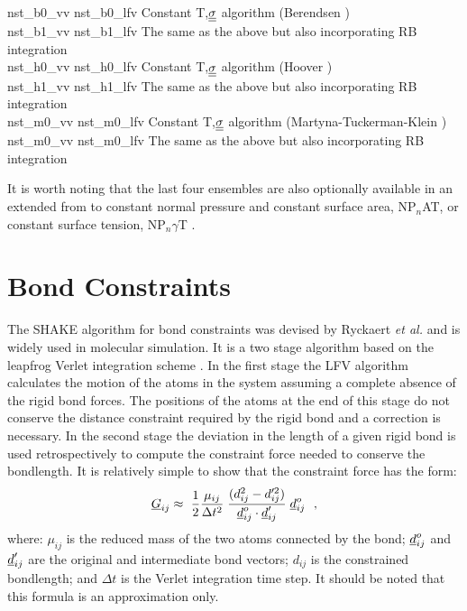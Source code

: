 \begin{tabbing}
{\sc nst\_b0\_vv}     \> {\sc nst\_b0\_lfv} \> Constant T,$\mbox{$\underline{\underline{\bf \sigma}}$}$ algorithm (Berendsen \cite{berendsen-84a}) \\
{\sc nst\_b1\_vv}     \> {\sc nst\_b1\_lfv} \> The same as the above but also incorporating RB integration \\
{\sc nst\_h0\_vv}     \> {\sc nst\_h0\_lfv} \> Constant T,$\mbox{$\underline{\underline{\bf \sigma}}$}$ algorithm (Hoover \cite{hoover-85a}) \\
{\sc nst\_h1\_vv}     \> {\sc nst\_h1\_lfv} \> The same as the above but also incorporating RB integration \\
{\sc nst\_m0\_vv}     \> {\sc nst\_m0\_lfv} \> Constant T,$\mbox{$\underline{\underline{\bf \sigma}}$}$ algorithm (Martyna-Tuckerman-Klein \cite{martyna-96a}) \\
{\sc nst\_m0\_vv}     \> {\sc nst\_m0\_lfv} \> The same as the above but also incorporating RB integration
\end{tabbing}

It is worth noting that the last four ensembles are also optionally
available in an extended from to constant normal pressure and
constant surface area, NP$_{n}$AT, or constant surface tension,
NP$_{n}\gamma$T \cite{ikeguchi-04a}.

\section{Bond Constraints}
\label{shake-rattle}

The SHAKE algorithm  for bond constraints
was devised by Ryckaert {\em et al.} \cite{ryckaert-77a} and is
widely used in molecular simulation.  It is a two stage algorithm
based on the leapfrog Verlet integration
scheme \cite{allen-89a}.  In the first stage the LFV algorithm
calculates the motion of the atoms in the system assuming a
complete absence of the rigid bond
forces. The positions of the atoms at the end of this stage
do not conserve the distance constraint required by the
rigid bond and a correction is necessary.
In the second stage the deviation in the length of a given
rigid bond is used retrospectively to
compute the constraint force needed to conserve the bondlength.
It is relatively simple to show that the constraint force has the form:
\begin{equation}
\mbox{$\underline{G}$}_{ij} \approx\ {1 \over 2} {\mu_{ij} \over \Delta t^{2}} \;
{(d_{ij}^{2} - d_{ij}'^{2}) \over \mbox{$\underline{d}$}_{ij}^{o} \cdot
\mbox{$\underline{d}$}_{ij}'} \; \mbox{$\underline{d}$}_{ij}^{o}~~, \label{g12}
\end{equation}
where: $\mu_{ij}$ is the reduced mass of the two atoms connected
by the bond; $\mbox{$\underline{d}$}_{ij}^{o}$ and $\mbox{$\underline{d}$}_{ij}'$ are the
original and intermediate bond vectors; $d_{ij}$ is the
constrained bondlength; and $\Delta t$ is the
Verlet integration time step.  It should
be noted that this formula is an approximation only.

